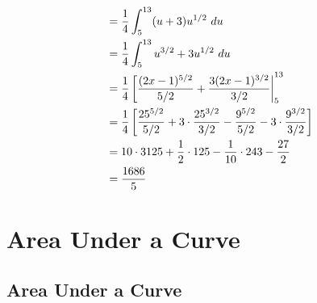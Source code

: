 \begin{exercise}
\begin{align}
                                        & = {1 \over 4} \int_5^{13} (u + 3)u^{1/2} \ du                                                                                                      \\
                                        & = {1 \over 4} \int_5^{13} u^{3/2} + 3u^{1/2} \ du                                                                                                  \\
                                        & = {1 \over 4} \left[ {(2x-1)^{5/2} \over {5/2}} + {3(2x-1)^{3/2} \over {3/2}} \right|_5^{13}                                                       \\
                                        & = {1 \over 4} \left[ {{{25^{5/2}} \over {5/2}} + 3 \cdot {{25^{3/2}} \over {3/2}} - {9^{5/2} \over {5/2}} - 3 \cdot {9^{3/2} \over {3/2}}} \right] \\
                                        & = 10 \cdot 3125 + {1 \over 2} \cdot 125 - {1 \over 10} \cdot 243 - {27 \over 2}                                                                    \\
                                        & = {1686 \over 5}
    \end{align}
\end{exercise}

\chapter{Area Under a Curve}

\section{Area Under a Curve}

